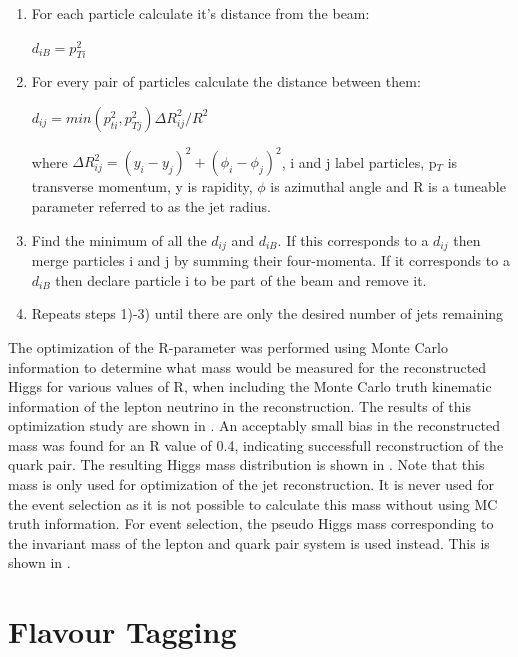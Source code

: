 \begin{enumerate}
\item For each particle calculate it's distance from the beam:
\begin{center}
  $d_{iB} = p_{Ti}^2$
\end{center}
\item For every pair of particles calculate the distance between them:
\begin{center}
  $d_{ij}=min(p_{ti}^2,p_{Tj}^2)\Delta R_{ij}^2/R^2$
\end{center}
where $\Delta R_{ij}^2=(y_i-y_j)^2 + (\phi_i-\phi_j)^2$, i and j label particles, p$_T$ is transverse momentum, y is rapidity, $\phi$ is azimuthal angle and R is a tuneable parameter referred to as the jet radius.
\item Find the minimum of all the $d_{ij}$ and $d_{iB}$. If this corresponds to a $d_{ij}$ then merge particles i and j by summing their four-momenta. If it corresponds to a $d_{iB}$ then declare particle i to be part of the beam and remove it.
\item Repeats steps 1)-3) until there are only the desired number of jets remaining
\end{enumerate}

The optimization of the R-parameter was performed using Monte Carlo information to determine what mass would be measured for the reconstructed Higgs for various values of R, when including the Monte Carlo truth kinematic information of the lepton neutrino in the reconstruction. The results of this optimization study are shown in . An acceptably small bias in the reconstructed mass was found for an R value of 0.4, indicating successfull reconstruction of the quark pair. The resulting Higgs mass distribution is shown in . Note that this mass is only used for optimization of the jet reconstruction. It is never used for the event selection as it is not possible to calculate this mass without using MC truth information. For event selection, the pseudo Higgs mass corresponding to the invariant mass of the lepton and quark pair system is used instead. This is shown in .



\section{Flavour Tagging}

